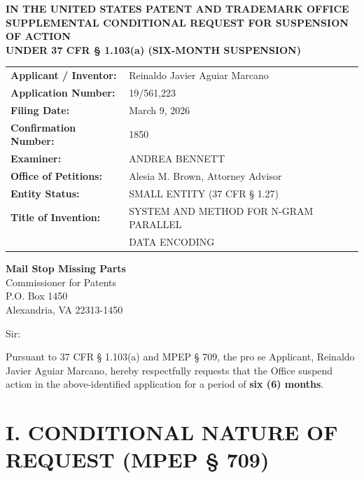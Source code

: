 \documentclass[11pt,letterpaper]{article}
\begin{document}
\thispagestyle{empty}

\begin{center}
    \textbf{\large IN THE UNITED STATES PATENT AND TRADEMARK OFFICE} \\
    \vspace{0.3cm}
    \textbf{\large SUPPLEMENTAL CONDITIONAL REQUEST FOR SUSPENSION OF ACTION} \\
    \textbf{\normalsize UNDER 37 CFR \S{} 1.103(a) (SIX-MONTH SUSPENSION)}
\end{center}

\vspace{0.4cm}
\noindent\begin{tabular}{p{2.3in}p{4.0in}}
\textbf{Applicant / Inventor:} & Reinaldo Javier Aguiar Marcano \\
\textbf{Application Number:} & 19/561,223 \\
\textbf{Filing Date:} & March 9, 2026 \\
\textbf{Confirmation Number:} & 1850 \\
\textbf{Examiner:} & ANDREA BENNETT \\
\textbf{Office of Petitions:} & Alesia M. Brown, Attorney Advisor \\
\textbf{Entity Status:} & SMALL ENTITY (37 CFR \S{} 1.27) \\
\textbf{Title of Invention:} & SYSTEM AND METHOD FOR N-GRAM PARALLEL \\
& DATA ENCODING \\
\end{tabular}

\vspace{0.5cm}
\noindent\textbf{Mail Stop Missing Parts} \\
Commissioner for Patents \\
P.O. Box 1450 \\
Alexandria, VA 22313-1450

\vspace{0.2cm}
Sir:

Pursuant to 37 CFR \S{} 1.103(a) and MPEP \S{} 709, the pro se Applicant, Reinaldo Javier Aguiar Marcano, hereby respectfully requests that the Office suspend action in the above-identified application for a period of \textbf{six (6) months}.

\section*{I. CONDITIONAL NATURE OF REQUEST (MPEP \S{} 709)}
\end{document}
